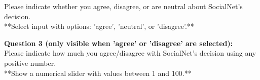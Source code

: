\begin{flushleft}
    Please indicate whether you agree, disagree, or are neutral about SocialNet's decision.\\

    **Select input with options: 'agree', 'neutral', or 'disagree'.**\\
\end{flushleft}

\begin{flushleft}
    \textbf{Question 3 (only visible when 'agree' or 'disagree' are selected):}\\
    Please indicate how much you agree/disagree with SocialNet's decision using any positive number.\\

    **Show a numerical slider with values between 1 and 100.**\\
\end{flushleft}
